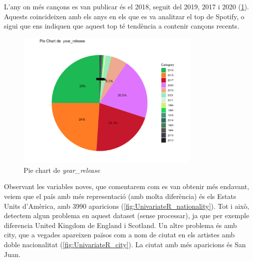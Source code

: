 L'any on més cançons es van publicar és el 2018, seguit del 2019, 2017 i 2020 (\ref{fig:UnivariateR_yearrelease}). Aquests coincideixen amb els anys en els que es va analitzar el top de Spotify, o sigui que ens indiquen que aquest top té tendència a contenir cançons recents.

\begin{figure}[H]
    \centering
    \includegraphics[width=0.8\textwidth]{Images/2_Univariate/pie_year_release.png}
    \caption{Pie chart de \textit{year\_release}}
    \label{fig:UnivariateR_yearrelease}
\end{figure}

Observant les variables noves, que comentarem com es van obtenir més endavant, veiem que el país amb més representació (amb molta diferència) és els Estats Units d'Amèrica, amb 3990 aparicions (\ref{fig:UnivariateR_nationality}). Tot i això, detectem algun problema en aquest dataset (sense processar), ja que per exemple diferencia United Kingdom de England i Scotland. Un altre problema és amb city, que a vegades apareixen països com a nom de ciutat en els artistes amb doble nacionalitat (\ref{fig:UnivariateR_city}). La ciutat amb més aparicions és San Juan.

